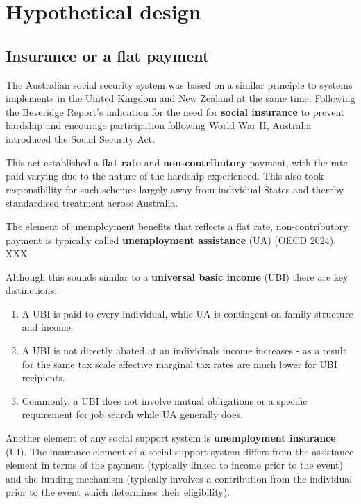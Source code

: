 \documentclass[
  letterpaper,
  DIV=11,
  numbers=noendperiod]{scrreprt}
\begin{document}

\hypertarget{hypothetical-design-1}{%
\chapter{Hypothetical design}\label{hypothetical-design-1}}

\hypertarget{insurance-or-a-flat-payment}{%
\section{Insurance or a flat
payment}\label{insurance-or-a-flat-payment}}

The Australian social security system was based on a similar principle
to systems implements in the United Kingdom and New Zealand at the same
time. Following the Beveridge Report's indication for the need for
\textbf{social insurance} to prevent hardship and encourage
participation following World War II, Australia introduced the Social
Security Act.

This act established a \textbf{flat rate} and \textbf{non-contributory}
payment, with the rate paid varying due to the nature of the hardship
experienced. This also took responsibility for such schemes largely away
from individual States and thereby standardised treatment across
Australia.

The element of unemployment benefits that reflects a flat rate,
non-contributory, payment is typically called \textbf{unemployment
assistance} (UA) (OECD 2024). XXX

Although this sounds similar to a \textbf{universal basic income} (UBI)
there are key distinctions:

\begin{enumerate}
\def\labelenumi{\arabic{enumi}.}
\item
  A UBI is paid to every individual, while UA is contingent on family
  structure and income.
\item
  A UBI is not directly abated at an individuals income increases - as a
  result for the same tax scale effective marginal tax rates are much
  lower for UBI recipients.
\item
  Commonly, a UBI does not involve mutual obligations or a specific
  requirement for job search while UA generally does.
\end{enumerate}

Another element of any social support system is \textbf{unemployment
insurance} (UI). The insurance element of a social support system
differs from the assistance element in terms of the payment (typically
linked to income prior to the event) and the funding mechanism
(typically involves a contribution from the individual prior to the
event which determines their eligibility).
\end{document}
